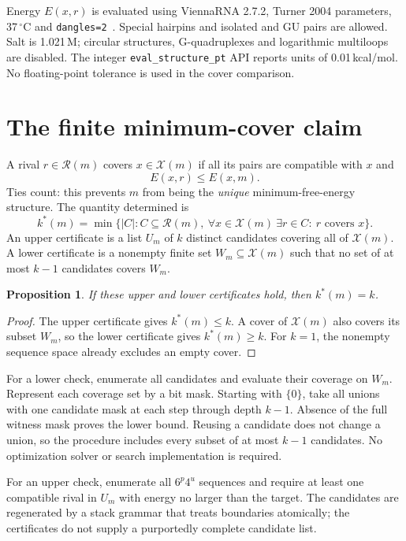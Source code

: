 \documentclass[10pt,a4paper]{article}
\newtheorem{proposition}{Proposition}
\newcommand{\Rset}{\mathcal R}
\newcommand{\Xset}{\mathcal X}
\begin{document}
Energy $E(x,r)$ is evaluated using ViennaRNA 2.7.2, Turner 2004 parameters, 37\,$^\circ$C and \texttt{dangles=2}~\cite{vienna}. Special hairpins and isolated and GU pairs are allowed. Salt is 1.021\,M; circular structures, G-quadruplexes and logarithmic multiloops are disabled. The integer \texttt{eval\_structure\_pt} API reports units of 0.01\,kcal/mol. No floating-point tolerance is used in the cover comparison.
\newpage
\section{The finite minimum-cover claim}
A rival $r\in\Rset(m)$ covers $x\in\Xset(m)$ if all its pairs are compatible with $x$ and
\[
 E(x,r)\le E(x,m).
\]
Ties count: this prevents $m$ from being the \emph{unique} minimum-free-energy structure. The quantity determined is
\[
 k^*(m)=\min\bigl\{|C|:C\subseteq\Rset(m),\ \forall x\in\Xset(m)\ \exists r\in C:\ r\text{ covers }x\bigr\}.
\]
An upper certificate is a list $U_m$ of $k$ distinct candidates covering all of $\Xset(m)$. A lower certificate is a nonempty finite set $W_m\subseteq\Xset(m)$ such that no set of at most $k-1$ candidates covers $W_m$.

\begin{proposition}
If these upper and lower certificates hold, then $k^*(m)=k$.
\end{proposition}
\begin{proof}
The upper certificate gives $k^*(m)\le k$. A cover of $\Xset(m)$ also covers its subset $W_m$, so the lower certificate gives $k^*(m)\ge k$. For $k=1$, the nonempty sequence space already excludes an empty cover.
\end{proof}

For a lower check, enumerate all candidates and evaluate their coverage on $W_m$. Represent each coverage set by a bit mask. Starting with $\{0\}$, take all unions with one candidate mask at each step through depth $k-1$. Absence of the full witness mask proves the lower bound. Reusing a candidate does not change a union, so the procedure includes every subset of at most $k-1$ candidates. No optimization solver or search implementation is required.

For an upper check, enumerate all $6^p4^u$ sequences and require at least one compatible rival in $U_m$ with energy no larger than the target. The candidates are regenerated by a stack grammar that treats boundaries atomically; the certificates do not supply a purportedly complete candidate list.
\end{document}
